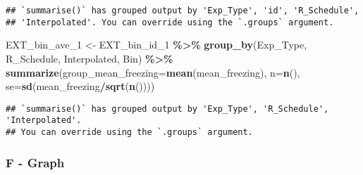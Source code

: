\documentclass[
]{article}
\newenvironment{Shaded}{\begin{snugshade}}{\end{snugshade}}
\newcommand{\AttributeTok}[1]{\textcolor[rgb]{0.13,0.29,0.53}{#1}}
\newcommand{\FunctionTok}[1]{\textcolor[rgb]{0.13,0.29,0.53}{\textbf{#1}}}
\newcommand{\NormalTok}[1]{#1}
\newcommand{\OtherTok}[1]{\textcolor[rgb]{0.56,0.35,0.01}{#1}}
\newcommand{\SpecialCharTok}[1]{\textcolor[rgb]{0.81,0.36,0.00}{\textbf{#1}}}
\newcommand{\StringTok}[1]{\textcolor[rgb]{0.31,0.60,0.02}{#1}}
\begin{document}
\begin{verbatim}
## `summarise()` has grouped output by 'Exp_Type', 'id', 'R_Schedule',
## 'Interpolated'. You can override using the `.groups` argument.
\end{verbatim}

\begin{Shaded}
\begin{Highlighting}[]
\NormalTok{EXT\_bin\_ave\_1 }\OtherTok{\textless{}{-}}\NormalTok{ EXT\_bin\_id\_1 }\SpecialCharTok{\%\textgreater{}\%} 
  \FunctionTok{group\_by}\NormalTok{(Exp\_Type, R\_Schedule, Interpolated, Bin) }\SpecialCharTok{\%\textgreater{}\%}
  \FunctionTok{summarize}\NormalTok{(}\AttributeTok{group\_mean\_freezing=}\FunctionTok{mean}\NormalTok{(mean\_freezing), }\AttributeTok{n=}\FunctionTok{n}\NormalTok{(),}
            \AttributeTok{se=}\FunctionTok{sd}\NormalTok{(mean\_freezing}\SpecialCharTok{/}\FunctionTok{sqrt}\NormalTok{(}\FunctionTok{n}\NormalTok{())))}
\end{Highlighting}
\end{Shaded}

\begin{verbatim}
## `summarise()` has grouped output by 'Exp_Type', 'R_Schedule', 'Interpolated'.
## You can override using the `.groups` argument.
\end{verbatim}

\begin{Shaded}
\end{Shaded}

\hypertarget{f---graph}{%
\subsubsection{F - Graph}\label{f---graph}}
\end{document}
